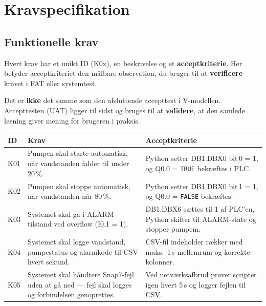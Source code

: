 \documentclass[12pt, a4paper]{article}
\begin{document}
\section{Kravspecifikation}

\subsection{Funktionelle krav}

\begin{tcolorbox}[infobox, title={\faInfoCircle\quad Læs inden du bruger kravene}]
Hvert krav har et unikt ID (K0x), en beskrivelse og et \textbf{acceptkriterie}.
Her betyder acceptkriteriet den målbare observation, du bruger til at
\textbf{verificere} kravet i FAT eller systemtest.

\vspace{4pt}
Det er \textbf{ikke} det samme som den afsluttende accepttest i V-modellen.
Accepttesten (UAT) ligger til sidst og bruges til at \textbf{validere}, at den
samlede løsning giver mening for brugeren i praksis.
\end{tcolorbox}

\vspace{0.3cm}
\begin{tabularx}{\textwidth}{lXX}
\toprule
\textbf{ID} & \textbf{Krav} & \textbf{Acceptkriterie} \\
\midrule
K01 & Pumpen skal starte automatisk, når vandstanden falder til under 20\,\%. &
  Python setter DB1.DBX0 bit\,0 = 1, og Q0.0 = \texttt{TRUE} bekræftes i PLC\@. \\[6pt]

K02 & Pumpen skal stoppe automatisk, når vandstanden når 80\,\%. &
  Python setter DB1.DBX0 bit\,1 = 1, og Q0.0 = \texttt{FALSE} bekræftes. \\[6pt]

K03 & Systemet skal gå i ALARM-tilstand ved overflow (I0.1 = 1). &
  DB1.DBX6 sættes til 1 af PLC'en, Python skifter til ALARM-state og stopper pumpem. \\[6pt]

K04 & Systemet skal logge vandstand, pumpestatus og alarmkode til CSV hvert sekund. &
  CSV-fil indeholder rækker med maks.\ 1\,s mellemrum og korrekte kolonner. \\[6pt]

K05 & Systemet skal håndtere Snap7-fejl uden at gå ned --- fejl skal logges og forbindelsen genoprettes. &
  Ved netværksafbrud prøver scriptet igen hvert 5\,s og logger fejlen til CSV\@. \\
\bottomrule
\end{tabularx}
\end{document}
